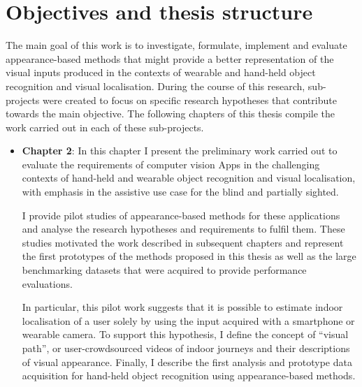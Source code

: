 \section{Objectives and thesis structure}

The main goal of this work is to investigate, formulate, implement and evaluate appearance-based methods that might provide a better representation of the visual inputs produced in the contexts of wearable and hand-held object recognition and visual localisation. During the course of this research, sub-projects were created to focus on specific research hypotheses that contribute towards the main objective. The following chapters of this thesis compile the work carried out in each of these sub-projects.


\begin{itemize}

\item \textbf{Chapter 2}: In this chapter I present the preliminary work carried out to evaluate the requirements of computer vision Apps in the challenging contexts of hand-held and wearable object recognition and visual localisation, with emphasis in the assistive use case for the blind and partially sighted. %

I provide pilot studies of appearance-based methods for these applications and analyse the research hypotheses and requirements to fulfil them. These studies motivated the work described in subsequent chapters and represent the first prototypes of the methods proposed in this thesis as well as the large benchmarking datasets that were acquired to provide performance evaluations.

In particular, this pilot work suggests that it is possible to estimate indoor localisation of a user solely by using the input acquired with a smartphone or wearable camera. To support this hypothesis, I define the concept of ``visual path'', or user-crowdsourced videos of indoor journeys and their descriptions of visual appearance. Finally, I describe the first analysis and prototype data acquisition for hand-held object recognition using appearance-based methods.



\end{itemize}
